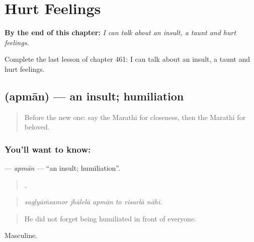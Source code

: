 
\chapter{Hurt Feelings}
\label{ch:mr-hurt-feelings}

\begin{chapteropening}
\textbf{By the end of this chapter:} \emph{I can talk about an insult, a taunt and hurt feelings.}

Complete the last lesson of chapter 461: I can talk about an insult, a taunt and hurt feelings.
\end{chapteropening}

\section[\texorpdfstring{\mr{अपमान} (apmān)}{अपमान (apmān)}]{ (apmān) — an insult; humiliation}

\label{lesson:MR-C461-apman}



\begin{quote}
Before the new one: say the Marathi for closeness, then the Marathi for beloved.
\end{quote}

\subsection*{You'll want to know: }
\textbf{} — \emph{apmān} — \textquotedblleft{}an insult; humiliation\textquotedblright{}.

\begin{quote}
     .
\end{quote}

\begin{quote}
\emph{sagḷyāṁsamor jhālelā apmān to visarlā nāhī.}
\end{quote}

\begin{quote}
He did not forget being humiliated in front of everyone.
\end{quote}

Masculine.

